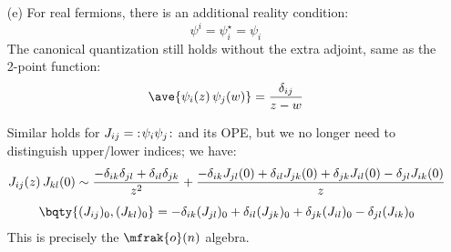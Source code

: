 \documentclass[a4paper,10pt]{article}
\begin{document}
\begin{enumerate}
\begin{enumerate}
	\item[(e)] For real fermions, there is an additional reality condition:
	\begin{equation}
		\psi^i = \psi^\star_i = \psi_i 
	\end{equation}
	The canonical quantization still holds without the extra adjoint, same as the 2-point function:
	\begin{equation}
		\ave{\psi_i(z)\,\psi_j(w)}
		= \frac{\delta_{ij}}{z - w}
	\end{equation}
	
	Similar holds for $J_{ij} = {\mathopen {:}}{{\hskip .1em} \psi_i\psi_j{\hskip .1em}}{\mathclose {:}}$ and its OPE, but we no longer need to distinguish upper/lower indices; we have:
	\begin{gather}
		J_{ij}(z)\,J_{kl}(0)
		\sim \frac{
			- \delta_{ik}\delta_{jl}
			+ \delta_{il}\delta_{jk}
		}{z^2} + \frac{
			- \delta_{ik} J_{jl}(0)
			+ \delta_{il} J_{jk}(0)
			+ \delta_{jk} J_{il}(0)
			- \delta_{jl} J_{ik}(0)
		}{z}\\[1ex]
		\bqty{
			(J_{ij})_0, (J_{kl})_0
		}
		= - \delta_{ik} (J_{jl})_0
			+ \delta_{il} (J_{jk})_0
			+ \delta_{jk} (J_{il})_0
			- \delta_{jl} (J_{ik})_0
	\end{gather}
	This is precisely the $\mfrak{o}(n)$ algebra. 
	\qedfull
	
	\end{enumerate}
	
	
	\end{enumerate}


\printbibliography[%
	,heading = bibintoc
]
\end{document}
